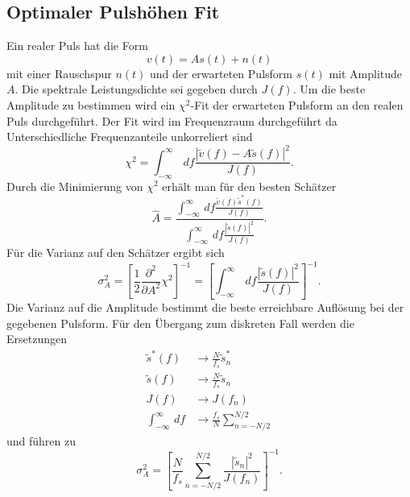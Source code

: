 \subsection{Optimaler Pulshöhen Fit}
Ein realer Puls hat die Form
\begin{equation}
v(t) = As(t) + n(t)
\end{equation}
mit einer Rauschspur $n(t)$ und der erwarteten Pulsform $s(t)$ mit Amplitude $A$.
Die spektrale Leistungsdichte sei gegeben durch $J(f)$.
Um die beste Amplitude zu bestimmen wird ein $\chi^2$-Fit der erwarteten Pulsform an den realen Puls durchgeführt.
Der Fit wird im Frequenzraum durchgeführt da Unterschiedliche Frequenzanteile unkorreliert sind
\begin{equation}
\chi^2 = \int_{-\infty}^\infty\, df \frac{|\widetilde{v}(f) - A\widetilde{s}(f)|^2}{J(f)}.
\end{equation}
Durch die Minimierung von $\chi^2$ erhält man für den besten Schätzer
\begin{equation}
\hat{A} = \frac{\int_{-\infty}^\infty\, df \frac{\widetilde{v}(f)\widetilde{s}^*(f)}{J(f)}}{\int_{-\infty}^\infty\, df \frac{|\widetilde{s}(f)|^2}{J(f)}}.
\end{equation}
Für die Varianz auf den Schätzer ergibt sich
\begin{equation}
\sigma^2_A = \left[\frac{1}{2}\frac{\partial^2}{\partial A^2}\chi^2\right]^{-1} = \left[\int_{-\infty}^\infty\, df \frac{|\widetilde{s}(f)|^2}{J(f)} \right ]^{-1}.
\end{equation}
Die Varianz auf die Amplitude bestimmt die beste erreichbare Auflösung bei der gegebenen Pulsform.
Für den Übergang zum diskreten Fall werden die Ersetzungen 
\begin{align*}
\widetilde{s}^*(f) &\rightarrow \frac{N}{f_s} \widetilde{s}^*_n \\
\widetilde{s}(f) &\rightarrow \frac{N}{f_s} \widetilde{s}_n \\
J(f) &\rightarrow J(f_n) \\
\int_{-\infty}^\infty\, df &\rightarrow \frac{f_s}{N}\sum_{n=-N/2}^{N/2}
\end{align*}
und führen zu
\begin{equation}
\sigma^2_A = \left[\frac{N}{f_s} \sum_{n=-N/2}^{N/2} \frac{|\widetilde{s}_n|^2}{J(f_n)}\right]^{-1}.
\end{equation}
